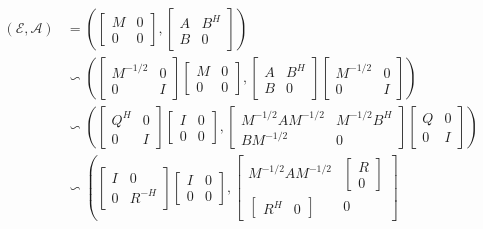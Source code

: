 \documentclass[]{book}
\theoremstyle{definition}
\theoremstyle{definition}
\theoremstyle{definition}
\theoremstyle{remark}
\begin{document}
\begin{align*}
(\mathcal E, \mathcal A) &=
\left(
\begin{bmatrix} M & 0 \\ 0 & 0 \end{bmatrix}
,
\begin{bmatrix} A & B^H \\ B & 0 \end{bmatrix}
\right) \\
& \backsim 
\left(
\begin{bmatrix} M^{-1/2} & 0 \\ 0 & I \end{bmatrix}
\begin{bmatrix} M & 0 \\ 0 & 0 \end{bmatrix}
,
\begin{bmatrix} A & B^H \\ B & 0 \end{bmatrix}
\begin{bmatrix} M^{-1/2} & 0 \\ 0 & I \end{bmatrix}
\right) \\
& \backsim 
\left(
\begin{bmatrix} Q^H & 0 \\ 0 & I \end{bmatrix}
\begin{bmatrix} I & 0 \\ 0 & 0 \end{bmatrix}
,
\begin{bmatrix} M^{-1/2}AM^{-1/2} &  M^{-1/2}B^H \\ B M^{-1/2} & 0 \end{bmatrix}
\begin{bmatrix} Q & 0 \\ 0 & I \end{bmatrix}
\right) \\
& \backsim 
\left(
\begin{bmatrix} I & 0 \\ 0 & R^{-H} \end{bmatrix}
\begin{bmatrix} I & 0 \\ 0 & 0 \end{bmatrix}
,
\begin{bmatrix} M^{-1/2}AM^{-1/2} &  \begin{bmatrix} R \\ 0 \end{bmatrix} \\ \begin{bmatrix}R^H & 0\end{bmatrix} & 0 \end{bmatrix}

\end{align*}
\end{document}
